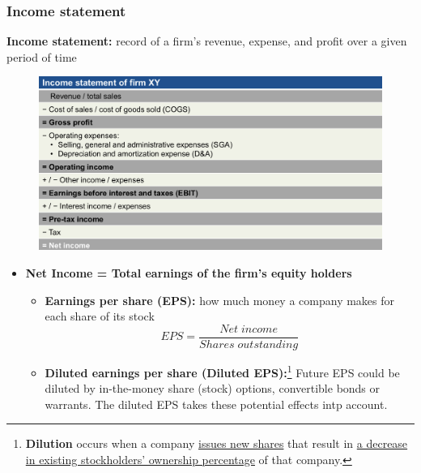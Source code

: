 \documentclass[ieeetran]{article}
\begin{document}
   







\subsubsection{Income statement} %
\label{ssub:subsubName}
\textbf{Income statement:} record of a firm's revenue, expense, and profit over a given period of time

\pagebreak

\begin{figure}[t]
  \centering
  \includegraphics[width=1\linewidth]{incomestatement.jpg}
  \label{fig:income_statement_figure}
\end{figure}
\begin{itemize}
  \item \textbf{Net Income = Total earnings of the firm's equity holders}
	  \begin{itemize}
	    \item \textbf{Earnings per share (EPS):} how much money a company makes for each share of its stock
		   \large
		   \begin{equation*}
		   \boxed{EPS = \frac{Net \; income}{Shares \; outstanding}}
		   \end{equation*}
		   \normalsize

	   \item \textbf{Diluted earnings per share (Diluted EPS):}\footnote{\textbf{Dilution} occurs when a company \underline{issues new shares} that result in \underline{a decrease in existing stockholders' ownership percentage} of that company.} Future EPS could be diluted by in-the-money share (stock) options, convertible bonds or warrants. The diluted EPS takes these potential effects intp account.		   	

	  \end{itemize}

\end{itemize}
\end{document}
